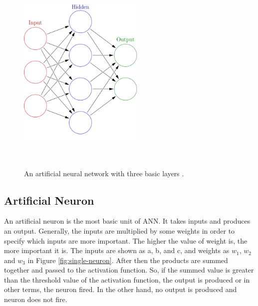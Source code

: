 \begin{figure}[htpb]
	\centering
	\includegraphics[width=6cm,height=10cm,keepaspectratio=true]{images/neural-net}
	\caption{
		An artificial neural network with three basic layers \cite{wiki:ann}.
	}
	\label{fig:wiki:ann}
\end{figure}


\subsection{Artificial Neuron}
An artificial neuron is the most basic unit of ANN. It takes inputs and produces an output. Generally, the inputs are multiplied by some weights in order to specify which inputs are more important. The higher the value of weight is, the more important it is. The inputs are shown as a, b, and c, and weights as $w_1$, $w_2$ and $w_3$ in Figure \ref{fig:single-neuron}. After then the products are summed together and passed to the activation function. So, if the summed value is greater than the threshold value of the activation function, the output is produced or in other terms, the neuron fired. In the other hand, no output is produced and neuron does not fire.

